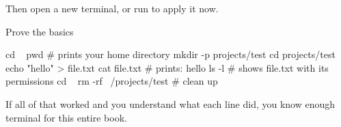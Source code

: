 Then open a new terminal, or run  to apply
it now.

\begin{checkpoint}{Prove the basics}
\begin{shell}
cd ~
pwd                       # prints your home directory
mkdir -p projects/test
cd projects/test
echo "hello" > file.txt
cat file.txt              # prints: hello
ls -l                     # shows file.txt with its permissions
cd ~
rm -rf ~/projects/test    # clean up
\end{shell}

If all of that worked and you understand what each line did, you know enough
terminal for this entire book.
\end{checkpoint}
